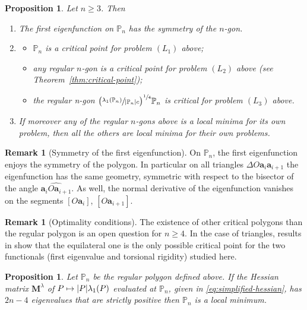 \documentclass[11pt]{article}
\numberwithin{equation}{section}\newtheorem*{jepEnonce}{\jepEnonceTitle}\newenvironment{enonce*}[1]{\def\jepEnonceTitle{#1}\jepEnonce}{\endjepEnonce}\newtheorem*{conj*}{Conjecture}
\def\mto{\mathchoice{\longmapsto}{\mapsto}{\mapsto}{\mapsto}}
\theoremstyle{plain}
\newtheorem{propo}[thm]{Proposition}
\theoremstyle{definition}
\newtheorem{rem}[thm]{Remark}
\newcommand{\bo}[1]{{\boldsymbol#1}}
\def\Pp{{\mathbb{P}_n}}
\let\jepOriginalSfrac\sfrac
\renewcommand{\sfrac}[2]{{\jepOriginalSfrac{#1}{#2}}}
\begin{document}
\begin{propo}
Let $n \geq 3$. Then
\begin{enumerate}
\item The first eigenfunction on $\Pp$ has the symmetry of the $n$-gon.
\item\mbox{}\vspace*{-1.2\baselineskip}
\begin{itemize}
\item $\Pp$ is a critical point for problem $(L_1)$ above;
\item any regular $n$-gon is a critical point for problem $(L_2)$ above (see Theorem~\ref{thm:critical-point});
\item the regular n-gon $\bigl(\sfrac{\lambda_1(\Pp)}{|\Pp| c}\bigr)^{\sfrac14} \Pp$ is critical for problem $(L_3)$ above.
\end{itemize}
\item
If moreover any of the regular $n$-gons above is a local minima for its own problem, then all the others are local minima for their own problems.
\end{enumerate}
\label{thm:criticality}
\end{propo}

\begin{rem}[Symmetry of the first eigenfunction]
On $\Pp$, the first eigenfunction enjoys the symmetry of the polygon. In particular on all triangles $\Delta O\bo a_i \bo a_{i+1}$ the eigenfunction has the same geometry, symmetric with respect to the bisector of the angle $\widehat {\bo a_iO \bo a_{i+1}}$. As well, the normal derivative of the eigenfunction vanishes on the segments $[O\bo a_i]$, $[O\bo a_{i+1}]$.
\label{rem:symm-eigenfunction}
\end{rem}

\begin{rem}[Optimality conditions]
The existence of other critical polygons than the regular polygon is an open question for $n \geq 4$. In the case of triangles, results in \cite{FragalaVelichkov19} show that the equilateral one is the only possible critical point for the two functionals (first eigenvalue and torsional rigidity) studied here.
\end{rem}

\begin{propo}
Let $\Pp$ be the regular polygon defined above. If the Hessian matrix $\bo M^\lambda$ of $P\mto |P|\lambda_1(P)$ evaluated at $\Pp$, given in \eqref{eq:simplified-hessian}, has $2n-4$ eigenvalues that are strictly positive then $\Pp$ is a local minimum.
\label{prop:justification-2n-4}
\end{propo}
\end{document}
